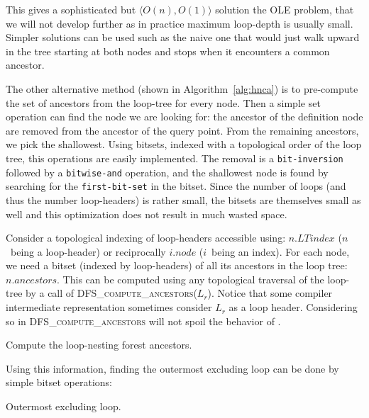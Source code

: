 This gives a sophisticated but $\langle O(n),O(1)\rangle$ solution the OLE problem, that we will not develop further as in practice maximum loop-depth is usually small.
Simpler solutions can be used such as the naive one that would just walk upward in the tree starting at both nodes and stops when it encounters a common ancestor.

The other alternative method (shown in Algorithm~\ref{alg:hnca}) is to pre-compute the set of ancestors from the loop-tree for every node.
Then a simple set operation can find the node we are looking for:
the ancestor of the definition node are removed from the ancestor of the query point.
From the remaining ancestors, we pick the shallowest.
Using bitsets, indexed with a topological order of the loop tree, this operations are easily implemented.
The removal is a \texttt{bit-inversion} followed by a \texttt{bitwise-and} operation, and the shallowest node is found by searching for the \texttt{first-bit-set} in the bitset.
Since the number of loops (and thus the number loop-headers) is rather small, the bitsets are themselves small as well and this optimization does not result in much wasted space.

Consider a topological indexing of loop-headers accessible using:
$n.LTindex$ ($n$~being a loop-header) or reciprocally $i.node$ ($i$~being an index).
For each node, we need a bitset (indexed by loop-headers) of all its ancestors in the loop tree:
$n.ancestors$.
This can be computed using any topological traversal of the loop-tree by a call of \textsc{DFS\_compute\_ancestors}($L_r$).
Notice that some compiler intermediate representation sometimes consider $L_r$ as a loop header.
Considering so in \textsc{DFS\_compute\_ancestors} will not spoil the behavior of \@OLE.

\begin{algorithm}
\caption{Compute the loop-nesting forest ancestors.}
\label{alg:ancestors}
\end{algorithm}

Using this information, finding the outermost excluding loop can be done by simple bitset operations:
\begin{algorithm}
\caption{Outermost excluding loop.}
\label{alg:hnca}
\end{algorithm}

